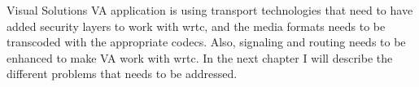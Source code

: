 Visual Solutions VA application is using transport technologies that need to have added security layers to work with \gls{wrtc}, and the media formats needs to be transcoded with the appropriate codecs. Also, signaling and routing needs to be enhanced to make VA work with \gls{wrtc}. In the next chapter I will describe the different problems that needs to be addressed.

